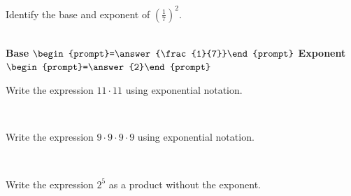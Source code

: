 \documentclass{ximera}
\begin{document}
\begin{problem} Identify the base and exponent of $\displaystyle \left(\frac{1}{7} \right)^2.$

 ~ \\[3em]  %

\hspace{2in} \textbf{Base} $\begin{prompt}=\answer{\frac{1}{7}}\end{prompt}$  \hspace{1in}  \textbf{Exponent} $\begin{prompt}=\answer{2}\end{prompt}$

\end{problem}


\begin{problem} Write the expression $11 \cdot 11 $ using exponential notation.

 ~ \\[3em]  %

\begin{multipleChoice}
  \end{multipleChoice}

\end{problem}


\begin{problem} Write the expression $9 \cdot 9 \cdot 9 \cdot 9$ using exponential notation.

 ~ \\[3em]  %

\begin{multipleChoice}
  \end{multipleChoice}

\end{problem}


\begin{problem} Write the expression $2^5$ as a product without the exponent.

 ~ \\[3em]  %

\begin{multipleChoice}
  \end{multipleChoice}

\end{problem}
\end{document}
